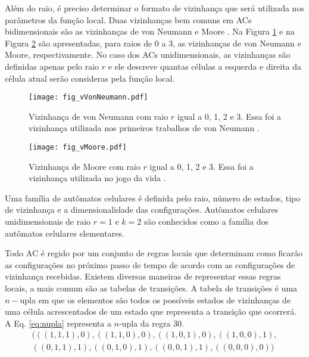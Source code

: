 Além do raio, é preciso determinar o formato de vizinhança que será utilizada nos parâmetros da função local. Duas vizinhanças bem comuns em ACs bidimensionais são as vizinhanças de von Neumann \cite{weisstein2015b} e Moore \cite{weisstein2015c}. Na Figura \ref{fig:vVonNeumann} e na Figura \ref{fig:vMoore} são apresentadas, para raios de 0 a 3, as vizinhanças de von Neumann e Moore, respectivamente. No caso dos ACs unidimensionais, as vizinhanças são definidas apenas pelo raio $r$ e ele descreve quantas células a esquerda e direita da célula atual serão consideras pela função local.

	\begin{figure}[h!]
	  \centering
	  \texttt{[image: fig\_vVonNeumann.pdf]}
	  \caption{Vizinhança de von Neumann com raio $r$ igual a 0, 1, 2 e 3. Essa foi a vizinhança utilizada nos primeiros trabalhos de von Neumann \cite{weisstein2015b}.}
	  \label{fig:vVonNeumann}
	\end{figure}

	\begin{figure}[h!]
	  \centering
  	  \texttt{[image: fig\_vMoore.pdf]}
	  \caption{Vizinhança de Moore com raio $r$ igual a 0, 1, 2 e 3. Essa foi a vizinhança utilizada no jogo da vida \cite{weisstein2015c}.}
	  \label{fig:vMoore}
	\end{figure}

Uma família de autômatos celulares é definida pelo raio, número de estados, tipo de vizinhança e a dimensionalidade das configurações. Autômatos celulares unidimensionais de raio $r=1$ e $k=2$ são conhecidos como a família dos autômatos celulares elementares.

Todo AC é regido por um conjunto de regras locais que determinam como ficarão as configurações no próximo passo de tempo de acordo com as configurações de vizinhança recebidas. Existem diversas maneiras de representar essas regras locais, a mais comum são as tabelas de transições. A tabela de transições é uma $n-$upla em que os elementos são todos os possíveis estados de vizinhanças de uma célula acrescentados de um estado que representa a transição que ocorrerá. A Eq. \eqref{eq:nupla} representa a $n$-upla da regra 30.
	\begin{equation}
	\begin{split}
	(((1,1,1),0),((1,1,0),0),((1,0,1),0),((1,0,0),1),\\
	((0,1,1),1),((0,1,0),1),((0,0,1),1),((0,0,0),0))
	\label{eq:nupla}
	\end{split}
	\end{equation}

